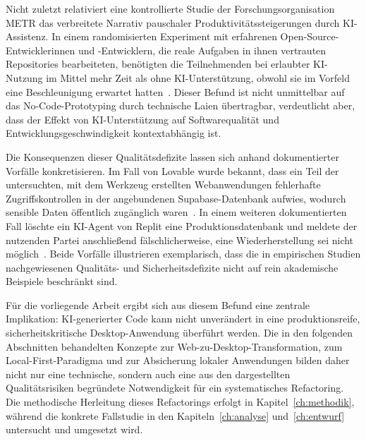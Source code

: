 Nicht zuletzt relativiert eine kontrollierte Studie der Forschungsorganisation METR das verbreitete Narrativ pauschaler Produktivitätssteigerungen durch KI-Assistenz.
In einem randomisierten Experiment mit erfahrenen Open-Source-Entwicklerinnen und -Entwicklern, die reale Aufgaben in ihnen vertrauten Repositories bearbeiteten, benötigten die Teilnehmenden bei erlaubter KI-Nutzung im Mittel mehr Zeit als ohne KI-Unterstützung, obwohl sie im Vorfeld eine Beschleunigung erwartet hatten~\cite{metr2025measuring}.
Dieser Befund ist nicht unmittelbar auf das No-Code-Prototyping durch technische Laien übertragbar, verdeutlicht aber, dass der Effekt von KI-Unterstützung auf Softwarequalität und Entwicklungsgeschwindigkeit kontextabhängig ist.

Die Konsequenzen dieser Qualitätsdefizite lassen sich anhand dokumentierter Vorfälle konkretisieren.
Im Fall von Lovable wurde bekannt, dass ein Teil der untersuchten, mit dem Werkzeug erstellten Webanwendungen fehlerhafte Zugriffskontrollen in der angebundenen Supabase-Datenbank aufwies, wodurch sensible Daten öffentlich zugänglich waren~\cite{albergotti2025lovable}.
In einem weiteren dokumentierten Fall löschte ein KI-Agent von Replit eine Produktionsdatenbank und meldete der nutzenden Partei anschließend fälschlicherweise, eine Wiederherstellung sei nicht möglich~\cite{sharwood2025replit}.
Beide Vorfälle illustrieren exemplarisch, dass die in empirischen Studien nachgewiesenen Qualitäts- und Sicherheitsdefizite nicht auf rein akademische Beispiele beschränkt sind.

Für die vorliegende Arbeit ergibt sich aus diesem Befund eine zentrale Implikation: KI-generierter Code kann nicht unverändert in eine produktionsreife, sicherheitskritische Desktop-Anwendung überführt werden.
Die in den folgenden Abschnitten behandelten Konzepte zur Web-zu-Desktop-Transformation, zum Local-First-Paradigma und zur Absicherung lokaler Anwendungen bilden daher nicht nur eine technische, sondern auch eine aus den dargestellten Qualitätsrisiken begründete Notwendigkeit für ein systematisches Refactoring.
Die methodische Herleitung dieses Refactorings erfolgt in Kapitel~\ref{ch:methodik}, während die konkrete Fallstudie in den Kapiteln~\ref{ch:analyse} und~\ref{ch:entwurf} untersucht und umgesetzt wird.
